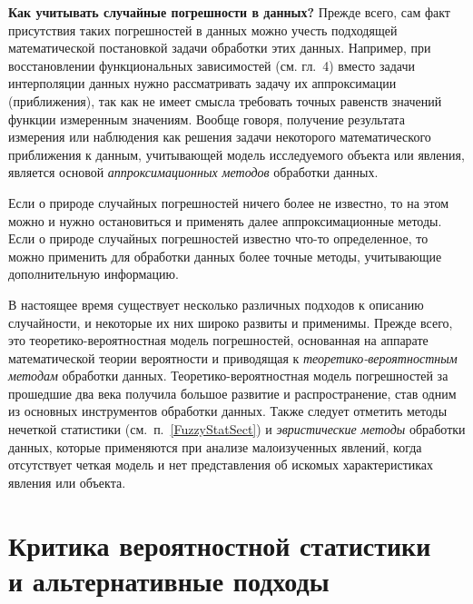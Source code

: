 \documentclass[a5paper,openany]{book}
\begin{document}
{%
{\bf Как учитывать случайные погрешности в данных?}
Прежде всего, сам факт присутствия таких погрешностей в данных можно учесть подходящей 
математической постановкой задачи обработки этих данных. Например, при восстановлении 
функциональных зависимостей (см. гл.~4) вместо задачи интерполяции данных нужно 
рассматривать задачу их аппроксимации (приближения), так как не имеет смысла требовать 
точных равенств значений функции измеренным значениям. Вообще говоря, получение результата 
измерения или наблюдения как решения задачи некоторого математического приближения 
к данным, учитывающей модель исследуемого объекта или явления, является основой 
\emph{аппроксимационных методов}  
обработки данных.   

Если о природе случайных погрешностей ничего более не известно, то на этом можно 
и нужно остановиться и применять далее аппроксимационные методы. Если о природе 
случайных погрешностей известно что-то определенное, то можно применить для обработки 
данных более точные методы, учитывающие дополнительную информацию. 

В настоящее время существует несколько различных подходов к описанию 
случайности, и некоторые их них широко развиты и применимы. Прежде всего, 
это теоретико-вероятностная модель погрешностей, основанная на аппарате математической 
теории вероятности и приводящая к \emph{теоретико-вероятностным методам} обработки 
данных. 
Теоретико-вероятностная модель погрешностей за прошедшие два 
века получила большое развитие и распространение, став одним из основных 
инструментов обработки данных. Также следует отметить методы нечеткой статистики 
(см.~п.~\ref{FuzzyStatSect}) 
и \emph{эвристические методы} обработки данных, которые 
применяются при анализе малоизученных явлений, когда отсутствует четкая модель и нет 
представления об искомых характеристиках явления или объекта.  

	\section{Критика вероятностной статистики \\  и альтернативные подходы} 


}
\end{document}
